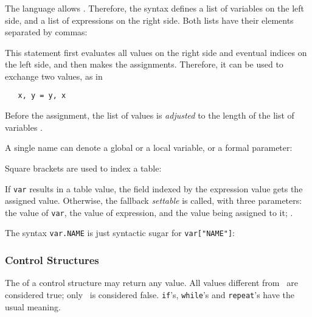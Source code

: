 \subsubsection{} \label{assignment}
The language allows .
Therefore, the syntax defines a list of variables on the left side,
and a list of expressions on the right side.
Both lists have their elements separated by commas:
\begin{Produc}
\end{Produc}%
This statement first evaluates all values on the right side
and eventual indices on the left side,
and then makes the assignments.
Therefore, it can be used to exchange two values, as in
\begin{verbatim}
   x, y = y, x
\end{verbatim}
Before the assignment, the list of values is {\em adjusted\/} to
the length of the list of variables .

A single name can denote a global or a local variable,
or a formal parameter:
\begin{Produc}
\end{Produc}%
Square brackets are used to index a table:
\begin{Produc}
\end{Produc}%
If \verb'var' results in a table value,
the field indexed by the expression value gets the assigned value.
Otherwise, the fallback {\em settable\/} is called,
with three parameters: the value of \verb'var',
the value of expression, and the value being assigned to it;
.

The syntax \verb'var.NAME' is just syntactic sugar for
\verb'var["NAME"]':
\begin{Produc}
\end{Produc}%

\subsubsection{Control Structures}
The  of a control structure may return any value.
All values different from \nil\ are considered true;
only \nil\ is considered false.
{\tt if}'s, {\tt while}'s and {\tt repeat}'s have the usual meaning.

\begin{Produc}
\end{Produc}

